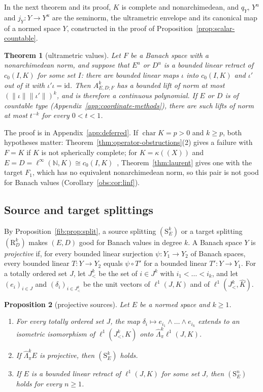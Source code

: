 \documentclass[11pt]{amsart}
\newtheorem{theorem}{Theorem}[section]
\newtheorem{proposition}[theorem]{Proposition}
\theoremstyle{definition}
\theoremstyle{remark}
\numberwithin{equation}{section}
\newcommand{\N}{\mathbb N}
\newcommand{\linf}{\ell^\infty}
\newcommand{\id}{\mathrm{id}}
\newcommand{\norm}[1]{\lVert #1\rVert}
\theoremstyle{plain}
\theoremstyle{definition}
\theoremstyle{plain}
\begin{document}
In the next theorem and its proof, $K$ is complete and nonarchimedean, and $q_Y$, $Y^u$ and $j_Y\colon Y\to Y^u$ are the
seminorm, the ultrametric envelope and its canonical map of a normed space $Y$, constructed in the proof of
Proposition~\ref{prop:scalar-countable}.

\begin{theorem}[ultrametric values]\label{fib:thm:ultra}
Let $F$ be a Banach space with a nonarchimedean norm, and suppose that $E^u$ or $D^u$ is a bounded linear retract of
$c_0(I,K)$ for some set $I$: there are bounded linear maps $\iota$ into $c_0(I,K)$ and $\iota'$ out of it with
$\iota'\iota=\id$. Then $A^k_{E,D;F}$ has a bounded lift of norm at most $(\norm\iota\norm{\iota'})^k$, and is therefore a continuous
polynomial. If $E$ or $D$ is of countable type (Appendix~\ref{app:coordinate-methods}), there are such lifts of norm at most $t^{-k}$ for every $0<t<1$.
\end{theorem}

The proof is in Appendix~\ref{app:deferred}. If $\operatorname{char}K=p>0$ and $k\ge p$, both hypotheses matter:
Theorem~\ref{thm:operator-obstructions}(2) gives a failure with $F=K$ if $K$ is not spherically complete; for
$K=\kappa((X))$ and $E=D=\linf(\N,K)\cong c_0(I,K)$~\cite[\S1, Proposition~1]{Se}, Theorem~\ref{thm:laurent} gives one
with the target $F_1$, which has no equivalent nonarchimedean norm, so this pair is not good for Banach values
(Corollary~\ref{obs:cor:linf}).

\subsection{Source and target splittings}\label{spl:ssec:source-target}

By Proposition~\ref{fib:prop:split}, a source splitting $(\mathrm S^k_E)$ or a target splitting $(\mathrm R^k_D)$ makes
$(E,D)$ good for Banach values in degree $k$. A Banach space $Y$ is \emph{projective} if, for every bounded linear
surjection $\psi\colon Y_1\to Y_2$ of Banach spaces, every bounded linear $T\colon Y\to Y_2$ equals $\psi\circ T'$ for a bounded
linear $T'\colon Y\to Y_1$. For a totally ordered set $J$, let $J^k_<$ be the set of $i\in J^k$ with $i_1<\dots<i_k$, and
let $(e_i)_{i\in J}$ and $(\delta_i)_{i\in J^k_<}$ be the unit vectors of $\ell^1(J,K)$ and of $\ell^1(J^k_<,\widehat K)$.

\begin{proposition}[projective sources]\label{spl:prop:projective}
Let $E$ be a normed space and $k\ge1$.
\begin{enumerate}
\item For every totally ordered set $J$, the map $\delta_i\mapsto e_{i_1}\wedge\dots\wedge e_{i_k}$ extends to an isometric
isomorphism of $\ell^1(J^k_<,\widehat K)$ onto $\widehat\Lambda^k_\pi\ell^1(J,K)$.
\item If $\widehat\Lambda^k_\pi E$ is projective, then $(\mathrm S^k_E)$ holds.
\item If $E$ is a bounded linear retract of $\ell^1(J,K)$ for some set $J$, then $(\mathrm S^n_E)$ holds for every $n\ge1$.
\end{enumerate}
\end{proposition}
\end{document}
